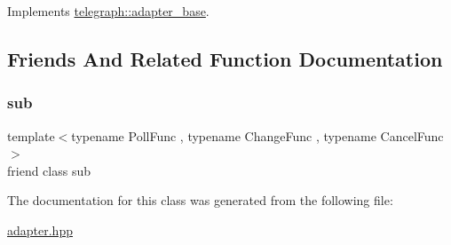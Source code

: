 Implements \hyperlink{classtelegraph_1_1adapter__base_a3b2347f991a3c621b35f20f81419cf62}{telegraph\+::adapter\+\_\+base}.



\subsection{Friends And Related Function Documentation}
\mbox{\label{classtelegraph_1_1adapter_aa1d42a83e16956670795959f328adff4}} 
\subsubsection{\texorpdfstring{sub}{sub}}
{\footnotesize\ttfamily template$<$typename Poll\+Func , typename Change\+Func , typename Cancel\+Func $>$ \\
friend class sub\hspace{0.3cm}{\ttfamily [friend]}}



The documentation for this class was generated from the following file\+:\begin{DoxyCompactItemize}
\item 
\hyperlink{adapter_8hpp}{adapter.\+hpp}\end{DoxyCompactItemize}
